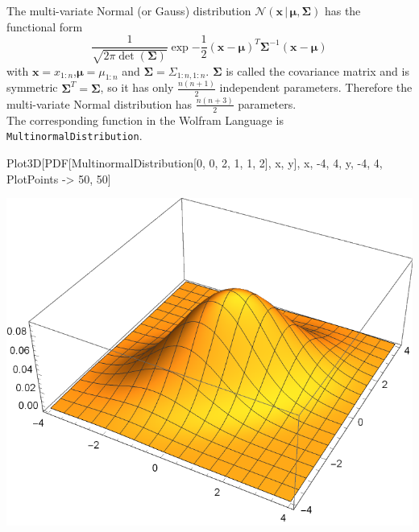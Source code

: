\documentclass{tstextbook}
\begin{document}
\begin{example}
  The multi-variate Normal (or Gauss) distribution
  $\mathcal{N}\left(\mathbf{x}\,\vert\,\boldsymbol{\mu},\boldsymbol{\Sigma}\right)$ has the functional form
  \begin{equation}
    \frac{1}{\sqrt{2\pi \det(\boldsymbol{\Sigma})}}\exp{-\frac{1}{2}(\mathbf{x}-\boldsymbol{\mu})^T\boldsymbol{\Sigma}^{-1}(\mathbf{x}-\boldsymbol{\mu})}
  \end{equation}
with $\mathbf{x}=x_{1:n}$,$\boldsymbol{\mu}=\mu_{1:n}$ and $\boldsymbol{\Sigma}=\Sigma_{1:n,1:n}$. $\boldsymbol{\Sigma}$ is called the covariance matrix and is symmetric $\boldsymbol{\Sigma}^T=\boldsymbol{\Sigma}$, so it has only $\frac{n(n+1)}{2}$ independent parameters. Therefore the multi-variate Normal distribution has $\frac{n(n+3)}{2}$ parameters.\\

The corresponding function in the Wolfram Language is \texttt{MultinormalDistribution}. \begin{mathematica}
Plot3D[PDF[MultinormalDistribution[{0, 0}, {{2, 1}, {1, 2}}], {x, y}],
       {x, -4, 4}, {y, -4, 4}, PlotPoints -> {50, 50}]
\end{mathematica}
\includegraphics{images/multi_normal_distribution.pdf}
\end{example}
\end{document}
